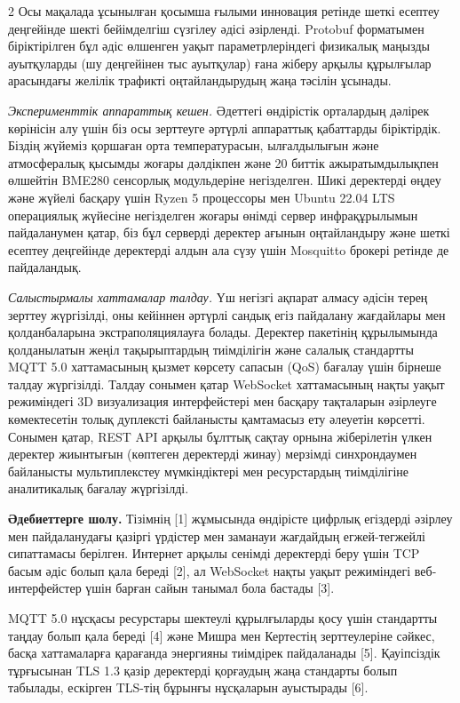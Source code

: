 \begin{multicols}{2}
Осы мақалада ұсынылған қосымша ғылыми инновация ретінде шеткі есептеу
деңгейінде шекті бейімделгіш сүзгілеу әдісі әзірленді. Protobuf
форматымен біріктірілген бұл әдіс өлшенген уақыт параметрлеріндегі
физикалық маңызды ауытқуларды (шу деңгейінен тыс ауытқулар) ғана жіберу
арқылы құрылғылар арасындағы желілік трафикті оңтайландырудың жаңа
тәсілін ұсынады.

\emph{Эксперименттік аппараттық кешен.} Әдеттегі өндірістік орталардың
дәлірек көрінісін алу үшін біз осы зерттеуге әртүрлі аппараттық
қабаттарды біріктірдік. Біздің жүйеміз қоршаған орта температурасын,
ылғалдылығын және атмосфералық қысымды жоғары дәлдікпен және 20 биттік
ажыратымдылықпен өлшейтін BME280 сенсорлық модульдеріне негізделген.
Шикі деректерді өңдеу және жүйелі басқару үшін Ryzen 5 процессоры мен
Ubuntu 22.04 LTS операциялық жүйесіне негізделген жоғары өнімді сервер
инфрақұрылымын пайдаланумен қатар, біз бұл серверді деректер ағынын
оңтайландыру және шеткі есептеу деңгейінде деректерді алдын ала сүзу
үшін Mosquitto брокері ретінде де пайдаландық.

\emph{Салыстырмалы хаттамалар талдау.} Үш негізгі ақпарат алмасу әдісін
терең зерттеу жүргізілді, оны кейіннен әртүрлі сандық егіз пайдалану
жағдайлары мен қолданбаларына экстраполяциялауға болады. Деректер
пакетінің құрылымында қолданылатын жеңіл тақырыптардың тиімділігін және
салалық стандартты MQTT 5.0 хаттамасының қызмет көрсету сапасын (QoS)
бағалау үшін бірнеше талдау жүргізілді. Талдау сонымен қатар WebSocket
хаттамасының нақты уақыт режиміндегі 3D визуализация интерфейстері мен
басқару тақталарын әзірлеуге көмектесетін толық дуплексті байланысты
қамтамасыз ету әлеуетін көрсетті. Сонымен қатар, REST API арқылы бұлттық
сақтау орнына жіберілетін үлкен деректер жиынтығын (көптеген деректерді
жинау) мерзімді синхрондаумен байланысты мультиплекстеу мүмкіндіктері
мен ресурстардың тиімділігіне аналитикалық бағалау жүргізілді.

{\bfseries Әдебиеттерге шолу.} Тізімнің {[}1{]} жұмысында өндірісте цифрлық
егіздерді әзірлеу мен пайдаланудағы қазіргі үрдістер мен заманауи
жағдайдың егжей-тегжейлі сипаттамасы берілген. Интернет арқылы сенімді
деректерді беру үшін TCP басым әдіс болып қала береді {[}2{]}, ал
WebSocket нақты уақыт режиміндегі веб-интерфейстер үшін барған сайын
танымал бола бастады {[}3{]}.

MQTT 5.0 нұсқасы ресурстары шектеулі құрылғыларды қосу үшін стандартты
таңдау болып қала береді {[}4{]} және Мишра мен Кертестің зерттеулеріне
сәйкес, басқа хаттамаларға қарағанда энергияны тиімдірек пайдаланады
{[}5{]}. Қауіпсіздік тұрғысынан TLS 1.3 қазір деректерді қорғаудың жаңа
стандарты болып табылады, ескірген TLS-тің бұрынғы нұсқаларын ауыстырады
{[}6{]}.


\end{multicols}
